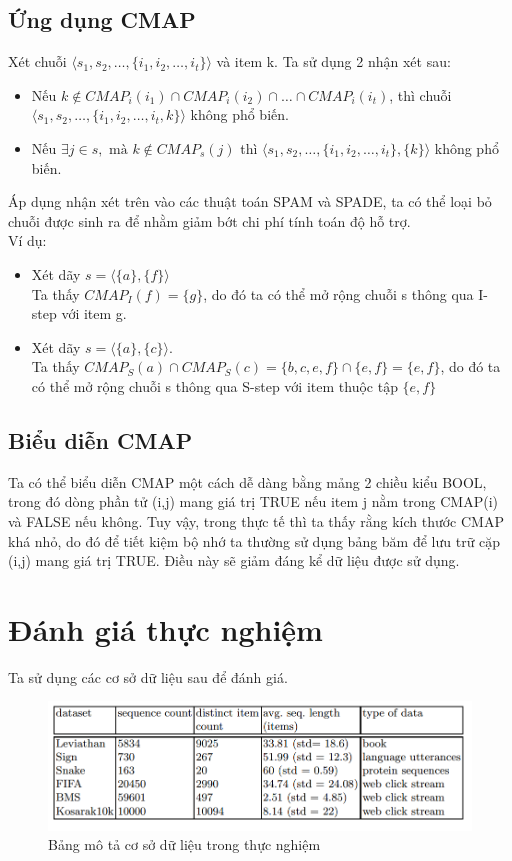 \documentclass[a4paper 14pt]{article}
\begin{document}
		\subsection{Ứng dụng CMAP}
			Xét chuỗi $\langle s_1, s_2, \hdots, \{i_1, i_2, \hdots, i_t\} \rangle$ và item k. Ta sử dụng 2 nhận xét sau:
			\begin{itemize}
				\item Nếu $k \notin CMAP_i(i_1) \cap CMAP_i(i_2) \cap \hdots \cap CMAP_i(i_t)$, thì chuỗi $\langle s_1, s_2, \hdots, \{i_1, i_2, \hdots, i_t, k\}\rangle$ không phổ biến.
				\item Nếu $\exists j \in s, \text{ mà } k \notin CMAP_s(j)$ thì $\langle s_1, s_2, \hdots, \{i_1, i_2, \hdots, i_t\}, \{k\} \rangle$ không phổ biến.
			\end{itemize}
			Áp dụng nhận xét trên vào các thuật toán SPAM và SPADE, ta có thể loại bỏ chuỗi được sinh ra để nhằm giảm bớt chi phí tính toán độ hỗ trợ.\\
			Ví dụ:
			\begin{itemize}
				\item Xét dãy $s = \langle \{a\}, \{f\} \rangle$\\
				Ta thấy $CMAP_I(f) = \{g\}$, do đó ta có thể mở rộng chuỗi s thông qua I-step với item g.
				\item Xét dãy $s = \langle \{a\}, \{c\} \rangle$.\\
				Ta thấy $CMAP_S(a) \cap CMAP_S(c) = \{b,c,e,f\} \cap \{e,f\} = \{e,f\}$, do đó ta có thể mở rộng chuỗi s thông qua S-step với item thuộc tập $\{e,f\}$
			\end{itemize}
		\subsection{Biểu diễn CMAP}
			Ta có thể biểu diễn CMAP một cách dễ dàng bằng mảng 2 chiều kiểu BOOL, trong đó dòng phần tử (i,j) mang giá trị TRUE nếu item j nằm trong CMAP(i) và FALSE nếu không. Tuy vậy, trong thực tế thì ta thấy rằng kích thước CMAP khá nhỏ, do đó để tiết kiệm bộ nhớ ta thường sử dụng bảng băm để lưu trữ cặp (i,j) mang giá trị TRUE. Điều này sẽ giảm đáng kể dữ liệu được sử dụng.
	\section{Đánh giá thực nghiệm}
		Ta sử dụng các cơ sở dữ liệu sau để đánh giá.\\
		\begin{figure}[H]
			\includegraphics[scale = 0.5]{datafeature}
			\caption{Bảng mô tả cơ sở dữ liệu trong thực nghiệm}
		\end{figure}
		
\end{document}
